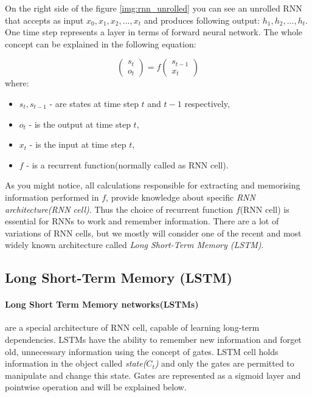 On the right side of the figure \ref{img:rnn_unrolled} you can see an
unrolled RNN that accepts as input $x_0, x_1, x_2, ..., x_t$ and produces following
output: $h_1, h_2, ..., h_t$. One time step represents a layer in terms
of forward neural network.
The whole concept can be explained in the following
equation:

\begin{equation} \label{eq:rnn_basic}
	\begin{pmatrix}
		s_t \\
		o_t
	\end{pmatrix} = f
	\begin{pmatrix}
		s_{t-1} \\
		x_t
	\end{pmatrix}
\end{equation}
where:
\begin{itemize}
	\item $s_t, s_{t-1}$ - are states at time step $t$ and $t-1$ respectively,
	\item $o_t$ - is the output at time step $t$,
	\item $x_t$ - is the input at time step $t$,
	\item $f$ - is a recurrent function(normally called as RNN cell).
\end{itemize}

As you might notice, all calculations responsible for extracting and
memorising information performed in $f$, provide knowledge about
specific \emph{RNN architecture(RNN cell)}.
Thus the choice of recurrent function $f$(RNN cell)
is essential for RNNs to work and remember information. There are a lot of variations
of RNN cells, but we mostly will consider one of the recent and
most widely known architecture called \emph{Long Short-Term Memory (LSTM)}.


\subsection{Long Short-Term Memory (LSTM)}
\paragraph{Long Short Term Memory networks(LSTMs)} are a special architecture of RNN cell,
capable of learning long-term dependencies. \cite{Hochreiter:1997:LSM:1246443.1246450}
LSTMs have the ability to remember new information and forget old, unnecessary information
using the concept of gates. LSTM cell holds information in the object called \emph{state($C_t$)}
and only the gates are permitted to manipulate and change this state.
Gates are represented as a sigmoid layer and pointwise operation and will be explained
below.

